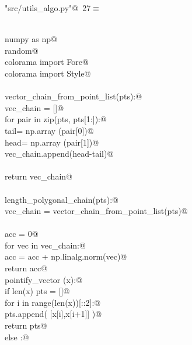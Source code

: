 \documentclass[10pt, english, oneside]{report}
\begin{document}
\begin{appendices}
\begin{flushleft} \small\label{scrap24}\raggedright\small
{} \verb@"src/utils_algo.py"@\nobreak\ {\footnotesize {27}}$\equiv$
\vspace{-1ex}
\begin{list}{}{} \item
\mbox{}\verb@@\\
\mbox{}\verb@import numpy as np@\\
\mbox{}\verb@import random@\\
\mbox{}\verb@from colorama import Fore@\\
\mbox{}\verb@from colorama import Style@\\
\mbox{}\verb@@\\
\mbox{}\verb@def vector_chain_from_point_list(pts):@\\
\mbox{}\verb@    vec_chain = []@\\
\mbox{}\verb@    for pair in zip(pts, pts[1:]):@\\
\mbox{}\verb@        tail= np.array (pair[0])@\\
\mbox{}\verb@        head= np.array (pair[1])@\\
\mbox{}\verb@        vec_chain.append(head-tail)@\\
\mbox{}\verb@@\\
\mbox{}\verb@    return vec_chain@\\
\mbox{}\verb@@\\
\mbox{}\verb@def length_polygonal_chain(pts):@\\
\mbox{}\verb@    vec_chain = vector_chain_from_point_list(pts)@\\
\mbox{}\verb@@\\
\mbox{}\verb@    acc = 0@\\
\mbox{}\verb@    for vec in vec_chain:@\\
\mbox{}\verb@        acc = acc + np.linalg.norm(vec)@\\
\mbox{}\verb@    return acc@\\
\mbox{}\verb@def pointify_vector (x):@\\
\mbox{}\verb@    if len(x) % 2 == 0:@\\
\mbox{}\verb@        pts = []@\\
\mbox{}\verb@        for i in range(len(x))[::2]:@\\
\mbox{}\verb@            pts.append( [x[i],x[i+1]] )@\\
\mbox{}\verb@        return pts@\\
\mbox{}\verb@    else :@\\

\end{list}
\end{flushleft}
\end{appendices}
\end{document}
